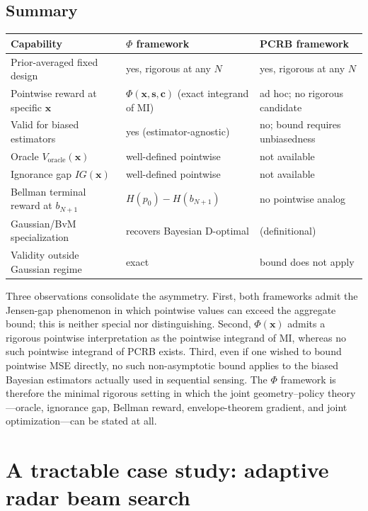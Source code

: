 \documentclass[11pt,a4paper]{article}
\begin{document}
\subsection{Summary}
\label{subsec:phi_vs_pcrb_summary}

\begin{center}
\begin{tabular}{@{}lll@{}}
\toprule
Capability & $\Phi$ framework & PCRB framework \\
\midrule
Prior-averaged fixed design & yes, rigorous at any $N$ & yes, rigorous at any $N$ \\
Pointwise reward at specific $\bm{x}$ & $\Phi(\bm{x}, \bm{s}, \bm{c})$ (exact integrand of MI) & ad hoc; no rigorous candidate \\
Valid for biased estimators & yes (estimator-agnostic) & no; bound requires unbiasedness \\
Oracle $V_{\mathrm{oracle}}(\bm{x})$ & well-defined pointwise & not available \\
Ignorance gap $IG(\bm{x})$ & well-defined pointwise & not available \\
Bellman terminal reward at $b_{N+1}$ & $H(p_0) - H(b_{N+1})$ & no pointwise analog \\
Gaussian/BvM specialization & recovers Bayesian D-optimal & (definitional) \\
Validity outside Gaussian regime & exact & bound does not apply \\
\bottomrule
\end{tabular}
\end{center}

Three observations consolidate the asymmetry.  First, both frameworks admit the Jensen-gap phenomenon in which pointwise values can exceed the aggregate bound; this is neither special nor distinguishing.  Second, $\Phi(\bm{x})$ admits a rigorous pointwise interpretation as the pointwise integrand of MI, whereas no such pointwise integrand of PCRB exists.  Third, even if one wished to bound pointwise MSE directly, no such non-asymptotic bound applies to the biased Bayesian estimators actually used in sequential sensing.  The $\Phi$ framework is therefore the minimal rigorous setting in which the joint geometry--policy theory---oracle, ignorance gap, Bellman reward, envelope-theorem gradient, and joint optimization---can be stated at all.

\section{A tractable case study: adaptive radar beam search}
\label{sec:examples}
\end{document}
